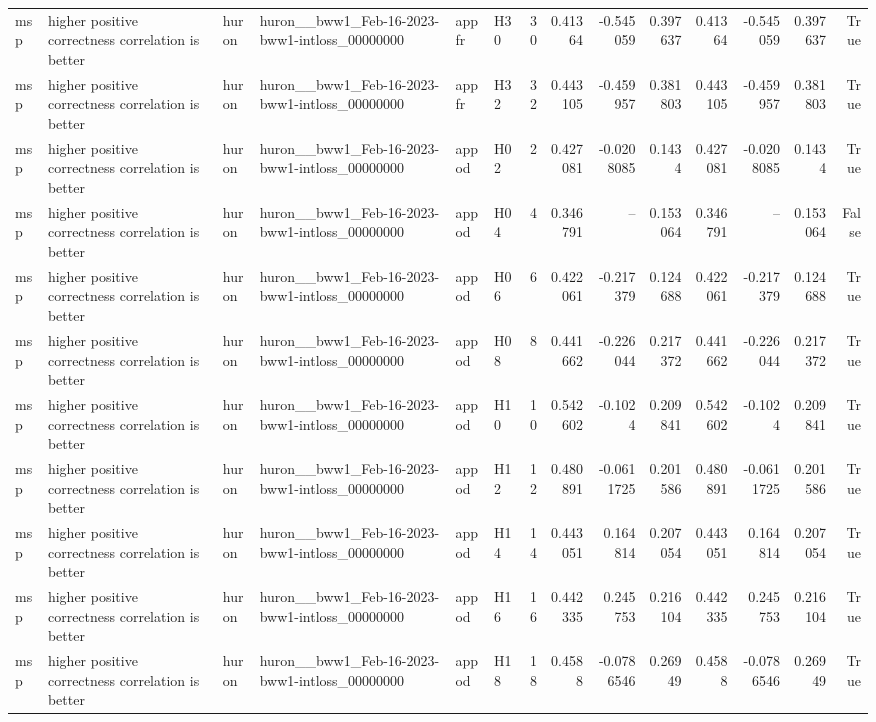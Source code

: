 \begin{longtable}{llllllrrrrrrrr}
msp & higher positive correctness correlation is better & huron & huron\_\_bww1\_Feb-16-2023-bww1-intloss\_00000000 & appfr & H30 & 30 & 0.41364 & -0.545059 & 0.397637 & 0.41364 & -0.545059 & 0.397637 & True \\
msp & higher positive correctness correlation is better & huron & huron\_\_bww1\_Feb-16-2023-bww1-intloss\_00000000 & appfr & H32 & 32 & 0.443105 & -0.459957 & 0.381803 & 0.443105 & -0.459957 & 0.381803 & True \\
msp & higher positive correctness correlation is better & huron & huron\_\_bww1\_Feb-16-2023-bww1-intloss\_00000000 & appod & H02 & 2 & 0.427081 & -0.0208085 & 0.1434 & 0.427081 & -0.0208085 & 0.1434 & True \\
msp & higher positive correctness correlation is better & huron & huron\_\_bww1\_Feb-16-2023-bww1-intloss\_00000000 & appod & H04 & 4 & 0.346791 & -- & 0.153064 & 0.346791 & -- & 0.153064 & False \\
msp & higher positive correctness correlation is better & huron & huron\_\_bww1\_Feb-16-2023-bww1-intloss\_00000000 & appod & H06 & 6 & 0.422061 & -0.217379 & 0.124688 & 0.422061 & -0.217379 & 0.124688 & True \\
msp & higher positive correctness correlation is better & huron & huron\_\_bww1\_Feb-16-2023-bww1-intloss\_00000000 & appod & H08 & 8 & 0.441662 & -0.226044 & 0.217372 & 0.441662 & -0.226044 & 0.217372 & True \\
msp & higher positive correctness correlation is better & huron & huron\_\_bww1\_Feb-16-2023-bww1-intloss\_00000000 & appod & H10 & 10 & 0.542602 & -0.1024 & 0.209841 & 0.542602 & -0.1024 & 0.209841 & True \\
msp & higher positive correctness correlation is better & huron & huron\_\_bww1\_Feb-16-2023-bww1-intloss\_00000000 & appod & H12 & 12 & 0.480891 & -0.0611725 & 0.201586 & 0.480891 & -0.0611725 & 0.201586 & True \\
msp & higher positive correctness correlation is better & huron & huron\_\_bww1\_Feb-16-2023-bww1-intloss\_00000000 & appod & H14 & 14 & 0.443051 & 0.164814 & 0.207054 & 0.443051 & 0.164814 & 0.207054 & True \\
msp & higher positive correctness correlation is better & huron & huron\_\_bww1\_Feb-16-2023-bww1-intloss\_00000000 & appod & H16 & 16 & 0.442335 & 0.245753 & 0.216104 & 0.442335 & 0.245753 & 0.216104 & True \\
msp & higher positive correctness correlation is better & huron & huron\_\_bww1\_Feb-16-2023-bww1-intloss\_00000000 & appod & H18 & 18 & 0.4588 & -0.0786546 & 0.26949 & 0.4588 & -0.0786546 & 0.26949 & True \\

\end{longtable}
